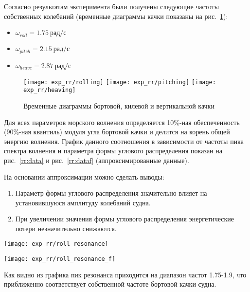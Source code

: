 Согласно результатам эксперимента были получены следующие частоты собственных колебаний (временные диаграммы качки показаны на рис.~\ref{exp_rr_rolling}):
\begin{itemize}
	\item	$ \omega_{roll} = 1.75\ \text{рад/с}$
	\item	$ \omega_{pitch} = 2.15\ \text{рад/с}$
	\item	$ \omega_{heave} = 2.87\ \text{рад/с}$
\end{itemize}

\begin{figure}[ht]
	\begin{center}
	\texttt{[image: exp\_rr/rolling]}
	\texttt{[image: exp\_rr/pitching]}
	\texttt{[image: exp\_rr/heaving]}
	\end{center}
	\caption{Временные диаграммы бортовой, килевой и вертикальной качки}
	\label{exp_rr_rolling}
\end{figure}

Для всех параметров морского волнения определяется 10\%-ная обеспеченность (90\%-ная квантиль) модуля угла бортовой качки и делится на корень общей энергию волнения. График данного соотношения в зависимости от частоты пика спектра волнения и параметра формы углового распределения показан на рис.~\ref{rr:data} и рис.~\ref{rr:dataf} (аппроксимированные данные).

На основании аппроксимации можно сделать выводы:
\begin{enumerate}
	\item	Параметр формы углового распределения значительно влияет на установившуюся амплитуду колебаний судна.
	\item 	При увеличении значения формы углового распределения энергетические потери незначительно снижаются.
\end{enumerate}

\begin{sidewaysfigure}
	\texttt{[image: exp\_rr/roll\_resonance]}
	\caption{Экспериментальные данные соотношения 10\%-ной обеспеченность модуля угла бортовой качки к энергии волнения.}
	\label{rr:data}
\end{sidewaysfigure}

\begin{sidewaysfigure}
	\texttt{[image: exp\_rr/roll\_resonance\_f]}
	\caption{Аппроксимация данных соотношения 10\%-ной обеспеченность модуля угла бортовой качки к энергии волнения и параметры функции отклика.}
	\label{rr:dataf}
\end{sidewaysfigure}


Как видно из графика пик резонанса приходится на диапазон частот 1.75-1.9, что приближенно соответствует собственной частоте бортовой качки судна.